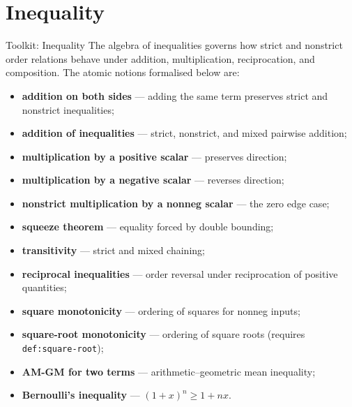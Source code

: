 \section{Inequality}

\begin{toolkitbox}{Toolkit: Inequality}
The algebra of inequalities governs how strict and nonstrict order
relations behave under addition, multiplication, reciprocation, and
composition.  The atomic notions formalised below are:
\begin{itemize}
  \item \textbf{addition on both sides} --- adding the same term preserves
        strict and nonstrict inequalities;
  \item \textbf{addition of inequalities} --- strict, nonstrict, and mixed
        pairwise addition;
  \item \textbf{multiplication by a positive scalar} --- preserves direction;
  \item \textbf{multiplication by a negative scalar} --- reverses direction;
  \item \textbf{nonstrict multiplication by a nonneg scalar} --- the zero
        edge case;
  \item \textbf{squeeze theorem} --- equality forced by double bounding;
  \item \textbf{transitivity} --- strict and mixed chaining;
  \item \textbf{reciprocal inequalities} --- order reversal under
        reciprocation of positive quantities;
  \item \textbf{square monotonicity} --- ordering of squares for
        nonneg inputs;
  \item \textbf{square-root monotonicity} --- ordering of square roots
        (requires \texttt{def:square-root});
  \item \textbf{AM-GM for two terms} --- arithmetic--geometric mean
        inequality;
  \item \textbf{Bernoulli's inequality} --- $(1+x)^n \ge 1 + nx$.
\end{itemize}
\end{toolkitbox}


